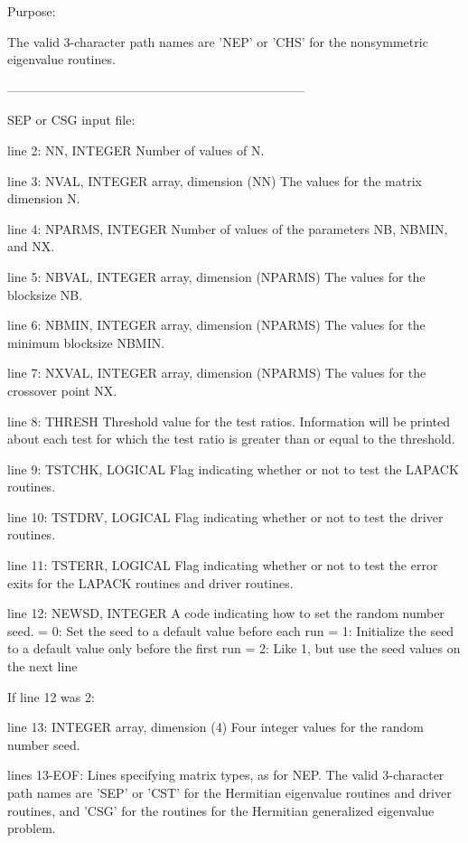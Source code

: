 \begin{DoxyParagraph}{Purpose\+: }
\begin{DoxyVerb}
          The valid 3-character path names are 'NEP' or 'CHS' for the
          nonsymmetric eigenvalue routines.

-----------------------------------------------------------------------

 SEP or CSG input file:

 line 2:  NN, INTEGER
          Number of values of N.

 line 3:  NVAL, INTEGER array, dimension (NN)
          The values for the matrix dimension N.

 line 4:  NPARMS, INTEGER
          Number of values of the parameters NB, NBMIN, and NX.

 line 5:  NBVAL, INTEGER array, dimension (NPARMS)
          The values for the blocksize NB.

 line 6:  NBMIN, INTEGER array, dimension (NPARMS)
          The values for the minimum blocksize NBMIN.

 line 7:  NXVAL, INTEGER array, dimension (NPARMS)
          The values for the crossover point NX.

 line 8:  THRESH
          Threshold value for the test ratios.  Information will be
          printed about each test for which the test ratio is greater
          than or equal to the threshold.

 line 9:  TSTCHK, LOGICAL
          Flag indicating whether or not to test the LAPACK routines.

 line 10: TSTDRV, LOGICAL
          Flag indicating whether or not to test the driver routines.

 line 11: TSTERR, LOGICAL
          Flag indicating whether or not to test the error exits for
          the LAPACK routines and driver routines.

 line 12: NEWSD, INTEGER
          A code indicating how to set the random number seed.
          = 0:  Set the seed to a default value before each run
          = 1:  Initialize the seed to a default value only before the
                first run
          = 2:  Like 1, but use the seed values on the next line

 If line 12 was 2:

 line 13: INTEGER array, dimension (4)
          Four integer values for the random number seed.

 lines 13-EOF:  Lines specifying matrix types, as for NEP.
          The valid 3-character path names are 'SEP' or 'CST' for the
          Hermitian eigenvalue routines and driver routines, and
          'CSG' for the routines for the Hermitian generalized
          eigenvalue problem.


\end{DoxyVerb}
\end{DoxyParagraph}

